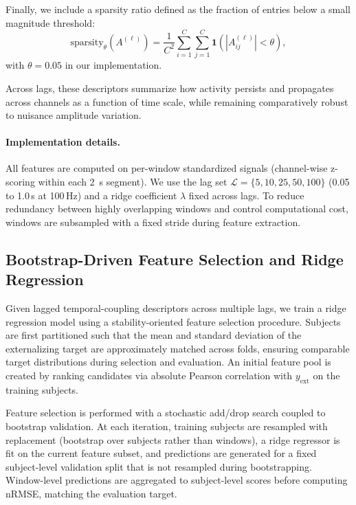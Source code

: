\documentclass[12pt]{article}
\begin{document}
Finally, we include a sparsity ratio defined as the fraction of entries below a small magnitude threshold:
\begin{equation}
\label{eq:ext_sparsity}
\mathrm{sparsity}_{\theta}(A^{(\ell)})=\frac{1}{C^2}\sum_{i=1}^{C}\sum_{j=1}^{C}\mathbf{1}\left(|A^{(\ell)}_{ij}|<\theta\right),
\end{equation}
with $\theta=0.05$ in our implementation.

Across lags, these descriptors summarize how activity persists and propagates across channels as a function of time
scale, while remaining comparatively robust to nuisance amplitude variation.

\paragraph{Implementation details.}
All features are computed on per-window standardized signals (channel-wise z-scoring within each 2~s segment). We use the
lag set $\mathcal{L}=\{5,10,25,50,100\}$ (0.05 to 1.0\,s at 100\,Hz) and a ridge coefficient $\lambda$ fixed across lags.
To reduce redundancy between highly overlapping windows and control computational cost, windows are subsampled with a
fixed stride during feature extraction.

\subsection{Bootstrap-Driven Feature Selection and Ridge Regression}
\label{sec:ch2_selection}

Given lagged temporal-coupling descriptors across multiple lags, we train a ridge regression model using a
stability-oriented feature selection procedure. Subjects are first partitioned such that the mean and standard deviation
of the externalizing target are approximately matched across folds, ensuring comparable target distributions during
selection and evaluation. An initial feature pool is created by ranking candidates via absolute Pearson correlation with
$y_{\mathrm{ext}}$ on the training subjects.

Feature selection is performed with a stochastic add/drop search coupled to bootstrap validation. At each iteration,
training subjects are resampled with replacement (bootstrap over subjects rather than windows), a ridge regressor is fit
on the current feature subset, and predictions are generated for a fixed subject-level validation split that is not
resampled during bootstrapping. Window-level predictions are aggregated to subject-level scores before computing nRMSE,
matching the evaluation target.
\end{document}
